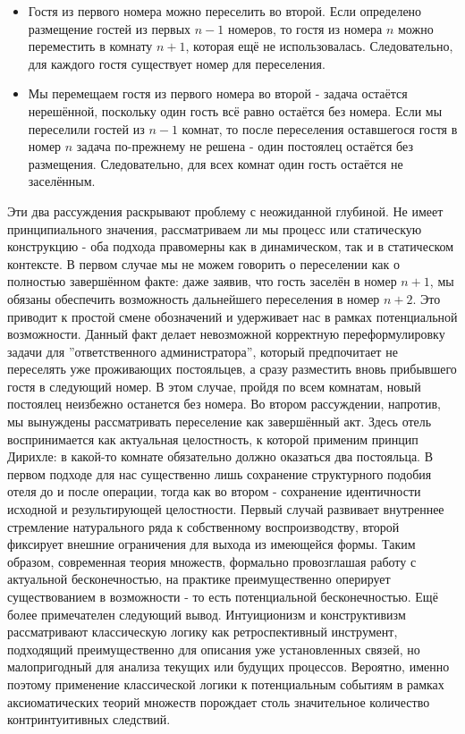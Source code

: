 \documentclass[12pt]{article}
\begin{document}
\begin{itemize}
	\item Гостя из первого номера можно переселить во второй. Если определено размещение гостей из первых $ n - 1$ номеров, то гостя из номера $n$ можно переместить в комнату $n + 1$, которая ещё не использовалась. Следовательно, для каждого гостя существует номер для переселения.
	\item Мы перемещаем гостя из первого номера во второй - задача остаётся нерешённой, поскольку один гость всё равно остаётся без номера. Если мы переселили гостей из $n - 1$ комнат, то после переселения оставшегося гостя в номер $n$ задача по-прежнему не решена - один постоялец остаётся без размещения. Следовательно, для всех комнат один гость остаётся не заселённым.
\end{itemize}

Эти два рассуждения раскрывают проблему с неожиданной глубиной. Не имеет принципиального значения, рассматриваем ли мы процесс или статическую конструкцию - оба подхода правомерны как в динамическом, так и в статическом контексте. В первом случае мы не можем говорить о переселении как о полностью завершённом факте: даже заявив, что гость заселён в номер $n + 1$, мы обязаны обеспечить возможность дальнейшего переселения в номер $n + 2$. Это приводит к простой смене обозначений и удерживает нас в рамках потенциальной возможности. Данный факт делает невозможной корректную переформулировку задачи для ''ответственного администратора'', который предпочитает не переселять уже проживающих постояльцев, а сразу разместить вновь прибывшего гостя в следующий номер. В этом случае, пройдя по всем комнатам, новый постоялец неизбежно останется без номера. Во втором рассуждении, напротив, мы вынуждены рассматривать переселение как завершённый акт. Здесь отель воспринимается как актуальная целостность, к которой применим принцип Дирихле: в какой-то комнате обязательно должно оказаться два постояльца. В первом подходе для нас существенно лишь сохранение структурного подобия отеля до и после операции, тогда как во втором - сохранение идентичности исходной и результирующей целостности. Первый случай развивает внутреннее стремление натурального ряда к собственному воспроизводству, второй фиксирует внешние ограничения для выхода из имеющейся формы. Таким образом, современная теория множеств, формально провозглашая работу с актуальной бесконечностью, на практике преимущественно оперирует существованием в возможности - то есть потенциальной бесконечностью. Ещё более примечателен следующий вывод. Интуиционизм и конструктивизм рассматривают классическую логику как ретроспективный инструмент, подходящий преимущественно для описания уже установленных связей, но малопригодный для анализа текущих или будущих процессов. Вероятно, именно поэтому применение классической логики к потенциальным событиям в рамках аксиоматических теорий множеств порождает столь значительное количество контринтуитивных следствий.
\end{document}

